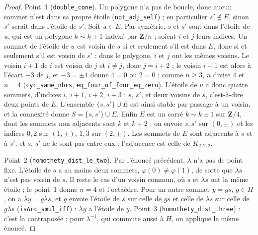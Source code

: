 \begin{proof}
Point~1 (\texttt{double\_cone}). Un polygone n'a pas de boucle, donc aucun sommet n'est dans sa propre étoile (\texttt{not\_adj\_self}) ; en particulier $s' \notin E$, sinon $s'$ serait dans l'étoile de $s'$. Soit $u \in E$. Par symétrie, $s$ et $s'$ sont dans l'étoile de $u$, qui est un polygone $k \sim k \pm 1$ indexé par $\mathbf Z/n$ ; soient $i$ et $j$ leurs indices. Un sommet de l'étoile de $u$ est voisin de $s$ si et seulement s'il est dans $E$, donc si et seulement s'il est voisin de $s'$ : dans le polygone, $i$ et $j$ ont les mêmes voisins. Le voisin $i + 1$ de $i$ est voisin de $j$ et $i \neq j$, donc $j = i + 2$ ; le voisin $i - 1$ est alors à l'écart $-3$ de $j$, et $-3 = \pm 1$ donne $4 = 0$ ou $2 = 0$ ; comme $n \geq 3$, $n$ divise $4$ et $n = 4$ (\texttt{cyc\_same\_nbrs}, \texttt{eq\_four\_of\_four\_eq\_zero}). L'étoile de $u$ a donc quatre sommets, d'indices $i$, $i + 1$, $i + 2$, $i + 3$ : $s$, $s'$, et deux voisins de $s$, c'est-à-dire deux points de $E$. L'ensemble $\{s, s'\} \cup E$ est ainsi stable par passage à un voisin, et la connexité donne $S = \{s, s'\} \cup E$. Enfin $E$ est un carré $k \sim k \pm 1$ sur $\mathbf Z/4$, dont les sommets non adjacents sont $k$ et $k + 2$ ; on envoie $s, s'$ sur $(0, \pm)$ et les indices $0, 2$ sur $(1, \pm)$, $1, 3$ sur $(2, \pm)$. Les sommets de $E$ sont adjacents à $s$ et à $s'$, et $s$, $s'$ ne le sont pas entre eux : l'adjacence est celle de $K_{2,2,2}$.

Point~2 (\texttt{homothety\_dist\_le\_two}). Par l'énoncé précédent, $\lambda$ n'a pas de point fixe. L'étoile de $s$ a au moins deux sommets, $\varphi(0) \neq \varphi(1)$, de sorte que $\lambda s$ n'est pas voisin de $s$. Il reste le cas d'un voisin commun, où $s$ et $\lambda s$ ont la même étoile ; le point~1 donne $n = 4$ et l'octaèdre. Pour un autre sommet $y = gs$, $g \in H$, on a $\lambda y = g\lambda s$, et $g$ envoie l'étoile de $s$ sur celle de $gs$ et celle de $\lambda s$ sur celle de $g\lambda s$ (\texttt{isArc\_smul\_iff}) : $\lambda y$ a l'étoile de $y$. Point~3 (\texttt{homothety\_dist\_three}) : c'est la contraposée ; pour $\lambda^{-1}$, qui commute aussi à $H$, on applique le même énoncé.
\end{proof}

